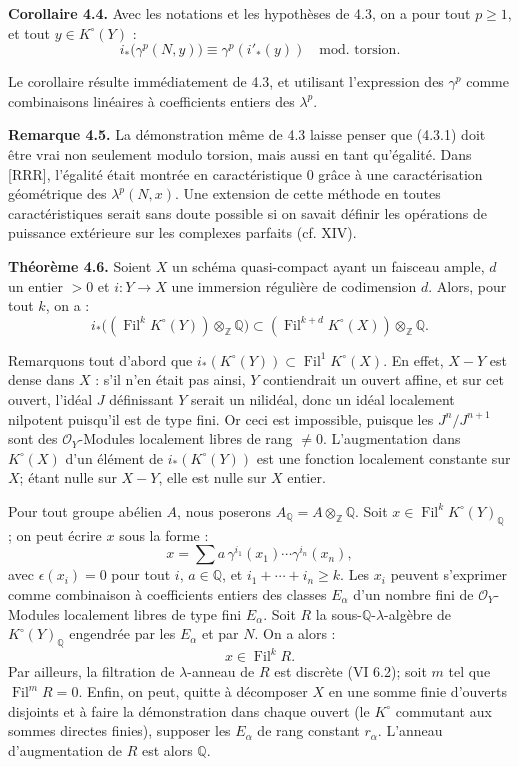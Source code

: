 \documentclass{article}
\newcommand{\Fil}{\operatorname{Fil}}
\begin{document}
\textbf{Corollaire 4.4.} Avec les notations et les hypothèses de 4.3, on a pour tout \(p\ge1\), et tout \(y\in K^\circ(Y)\) :
\[
  i_*\bigl(\gamma^p(N,y)\bigr)\equiv \gamma^p(i'_*(y))
  \quad\text{mod.\ torsion}.
\]

Le corollaire résulte immédiatement de 4.3, et utilisant l'expression des \(\gamma^p\) comme combinaisons linéaires à coefficients entiers des \(\lambda^p\).

\textbf{Remarque 4.5.} La démonstration même de 4.3 laisse penser que (4.3.1) doit être vrai non seulement modulo torsion, mais aussi en tant qu'égalité. Dans [RRR], l'égalité était montrée en caractéristique \(0\) grâce à une caractérisation géométrique des \(\lambda^p(N,x)\). Une extension de cette méthode en toutes caractéristiques serait sans doute possible si on savait définir les opérations de puissance extérieure sur les complexes parfaits (cf. XIV).


\textbf{Théorème 4.6.}
Soient \(X\) un schéma quasi-compact ayant un faisceau ample, \(d\) un entier \(>0\) et \(i:Y\to X\) une immersion régulière de codimension \(d\). Alors, pour tout \(k\), on a :
\[
 i_*\bigl((\Fil^kK^\circ(Y))\otimes_{\mathbb Z}\mathbb Q\bigr)
 \subset
 (\Fil^{k+d}K^\circ(X))\otimes_{\mathbb Z}\mathbb Q.
\]

Remarquons tout d'abord que \(i_*(K^\circ(Y))\subset \Fil^1K^\circ(X)\). En effet, \(X-Y\) est dense dans \(X\) : s'il n'en était pas ainsi, \(Y\) contiendrait un ouvert affine, et sur cet ouvert, l'idéal \(J\) définissant \(Y\) serait un nilidéal, donc un idéal localement nilpotent puisqu'il est de type fini. Or ceci est impossible, puisque les \(J^n/J^{n+1}\) sont des \(\mathcal O_Y\)-Modules localement libres de rang \(\ne0\). L'augmentation dans \(K^\circ(X)\) d'un élément de \(i_*(K^\circ(Y))\) est une fonction localement constante sur \(X\); étant nulle sur \(X-Y\), elle est nulle sur \(X\) entier.

Pour tout groupe abélien \(A\), nous poserons \(A_{\mathbb Q}=A\otimes_{\mathbb Z}\mathbb Q\). Soit \(x\in\Fil^kK^\circ(Y)_{\mathbb Q}\) ; on peut écrire \(x\) sous la forme :
\[
  x=\sum a\,\gamma^{i_1}(x_1)\cdots\gamma^{i_n}(x_n),
\]
avec \(\epsilon(x_i)=0\) pour tout \(i\), \(a\in\mathbb Q\), et \(i_1+\cdots+i_n\ge k\). Les \(x_i\) peuvent s'exprimer comme combinaison à coefficients entiers des classes \(E_\alpha\) d'un nombre fini de \(\mathcal O_Y\)-Modules localement libres de type fini \(E_\alpha\). Soit \(R\) la sous-\(\mathbb Q\)-\(\lambda\)-algèbre de \(K^\circ(Y)_{\mathbb Q}\) engendrée par les \(E_\alpha\) et par \(N\). On a alors :
\[
  x\in\Fil^kR.
\]
Par ailleurs, la filtration de \(\lambda\)-anneau de \(R\) est discrète (VI 6.2); soit \(m\) tel que \(\Fil^mR=0\). Enfin, on peut, quitte à décomposer \(X\) en une somme finie d'ouverts disjoints et à faire la démonstration dans chaque ouvert (le \(K^\circ\) commutant aux sommes directes finies), supposer les \(E_\alpha\) de rang constant \(r_\alpha\). L'anneau d'augmentation de \(R\) est alors \(\mathbb Q\).
\end{document}
